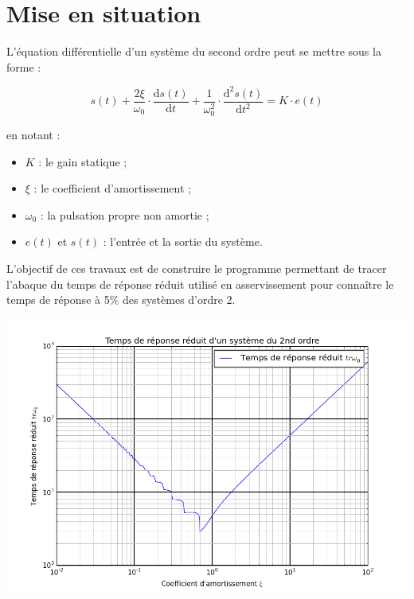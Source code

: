 \documentclass[10pt,fleqn]{article} %
\begin{document}

\vspace{2cm}
\pagestyle{fancy}
\thispagestyle{plain}

\section{Mise en situation}
\ifprof
\else

L'équation différentielle d'un système du second ordre peut se mettre sous la forme :

\vspace{.25cm}

\begin{minipage}[c]{.48\linewidth}
$$
s(t)
+\dfrac{2\xi}{\omega_0}\cdot \dfrac{\text{d}s(t)}{\text{d}t}
+\dfrac{1}{\omega_0^2}\cdot \dfrac{\text{d}^2s(t)}{\text{d}t^2}
= K\cdot e(t)
$$
\end{minipage}\hfill
\begin{minipage}[c]{.48\linewidth}
en notant :
\begin{itemize}
\item $K$ : le gain statique ;
\item $\xi$ : le coefficient d'amortissement ;
\item $\omega_0$ : la pulsation propre non amortie ;
\item $e(t)$ et $s(t)$ : l'entrée et la sortie du système. 
\end{itemize}
\end{minipage}


\begin{minipage}[c]{.48\linewidth}
\begin{obj}
L'objectif de ces travaux est de construire le programme permettant de tracer l'abaque du temps de réponse réduit utilisé en asservissement pour connaître le temps de réponse à 5\% des systèmes d'ordre 2. 
\end{obj}
\end{minipage}\hfill
\begin{minipage}[c]{.5\linewidth}
\begin{center}
\includegraphics[width=.95\textwidth]{images/figure_1}
\end{center}
\end{minipage}
\end{document}
